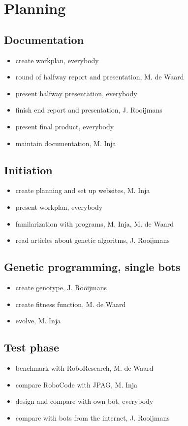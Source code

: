 \documentclass[a4paper,10pt]{article}
\begin{document}
\newpage
\section{Planning}
\subsection{Documentation}
\begin{itemize}
 \item create workplan, everybody
 \item round of halfway report and presentation, M. de Waard
 \item present halfway presentation, everybody
 \item finish end report and presentation, J. Rooijmans
 \item present final product, everybody
 \item maintain documentation, M. Inja
\end{itemize}

\subsection{Initiation}
\begin{itemize}
\item create planning and set up websites, M. Inja
\item present workplan, everybody
\item familarization with programs, M. Inja, M. de Waard
\item read articles about genetic algoritms, J. Rooijmans
\end{itemize}

\subsection{Genetic programming, single bots}
\begin{itemize}
\item create genotype, J. Rooijmans
\item create fitness function, M. de Waard
\item evolve, M. Inja
\end{itemize}

\subsection{Test phase}
\begin{itemize}
\item benchmark with RoboResearch, M. de Waard
\item compare RoboCode with JPAG, M. Inja
\item design and compare with own bot, everybody
\item compare with bots from the internet, J. Rooijmans
\end{itemize}
\end{document}
